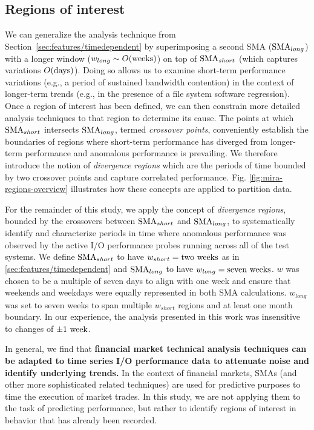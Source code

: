 \subsection{Regions of interest} \label{sec:features/partitioning}

We can generalize the analysis technique from
Section~\ref{sec:features/timedependent} 
by superimposing a second SMA ($\textup{SMA}_{long}$) with a longer window (${w_{long} \sim O(\textup{weeks})}$) on top of $\textup{SMA}_{short}$ (which captures variations ${O(\textup{days})}$).
Doing so allows us to examine short-term performance variations (e.g., a
period of sustained bandwidth contention) in the context of longer-term
trends (e.g., in the presence of a file system software regression).  Once a
region of interest has been defined, we can then constrain more detailed
analysis techniques to that region to determine its cause.
The points at which $\textup{SMA}_{short}$ intersects $\textup{SMA}_{long}$, termed \emph{crossover points}, conveniently establish the boundaries of regions where short-term performance has diverged from longer-term performance and anomalous performance is prevailing.
We therefore introduce the notion of \emph{divergence regions} which are the periods of time bounded by two crossover points and capture correlated performance.
Fig. \ref{fig:mira-regions-overview} illustrates how these concepts are applied to partition data.

For the remainder of this study, we apply the concept of \emph{divergence regions}, bounded by the crossovers between $\textup{SMA}_{short}$ and $\textup{SMA}_{long}$, to systematically identify and characterize periods in time where anomalous performance was observed by the active I/O performance probes running across all of the test systems.
We define $\textup{SMA}_{short}$ to have ${w_{short} = \textup{two weeks}}$ as in \ref{sec:features/timedependent} and $\textup{SMA}_{long}$ to have ${w_{long} = \textup{seven weeks}}$.
$w$ was chosen to be a multiple of seven days to align with one
week and ensure that weekends and weekdays were equally represented in both SMA
calculations. $w_{long}$ was set to seven weeks to span multiple $w_{short}$
regions and at least one month boundary.  In our experience, the analysis
presented in this work was insensitive to changes of $\pm 1 \textup{ week}$.

In general, we find that \textbf{financial market technical
analysis techniques can be adapted to
time series I/O performance data to attenuate noise and identify underlying trends.}
In the context of financial markets, SMAs (and other more
sophisticated related techniques) are used for predictive purposes to time
the execution of market trades.  In this study, we are not applying them to
the task of predicting performance, but rather to identify regions of
interest in behavior that has already been recorded.

